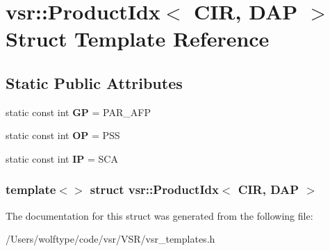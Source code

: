 \hypertarget{structvsr_1_1_product_idx_3_01_c_i_r_00_01_d_a_p_01_4}{\section{vsr\-:\-:Product\-Idx$<$ C\-I\-R, D\-A\-P $>$ Struct Template Reference}
\label{structvsr_1_1_product_idx_3_01_c_i_r_00_01_d_a_p_01_4}
}
\subsection*{Static Public Attributes}
\begin{DoxyCompactItemize}
\item 
\hypertarget{structvsr_1_1_product_idx_3_01_c_i_r_00_01_d_a_p_01_4_ad9b7ed5e64ffbcc52064f5830d465c1b}{static const int {\bfseries G\-P} = P\-A\-R\-\_\-\-A\-F\-P}\label{structvsr_1_1_product_idx_3_01_c_i_r_00_01_d_a_p_01_4_ad9b7ed5e64ffbcc52064f5830d465c1b}

\item 
\hypertarget{structvsr_1_1_product_idx_3_01_c_i_r_00_01_d_a_p_01_4_ada3b37f1c0c4c600954fd8597045e954}{static const int {\bfseries O\-P} = P\-S\-S}\label{structvsr_1_1_product_idx_3_01_c_i_r_00_01_d_a_p_01_4_ada3b37f1c0c4c600954fd8597045e954}

\item 
\hypertarget{structvsr_1_1_product_idx_3_01_c_i_r_00_01_d_a_p_01_4_a1ebd92268ca6ac1acd6839b244c6a78e}{static const int {\bfseries I\-P} = S\-C\-A}\label{structvsr_1_1_product_idx_3_01_c_i_r_00_01_d_a_p_01_4_a1ebd92268ca6ac1acd6839b244c6a78e}

\end{DoxyCompactItemize}
\subsubsection*{template$<$$>$ struct vsr\-::\-Product\-Idx$<$ C\-I\-R, D\-A\-P $>$}



The documentation for this struct was generated from the following file\-:\begin{DoxyCompactItemize}
\item 
/\-Users/wolftype/code/vsr/\-V\-S\-R/vsr\-\_\-templates.\-h\end{DoxyCompactItemize}
